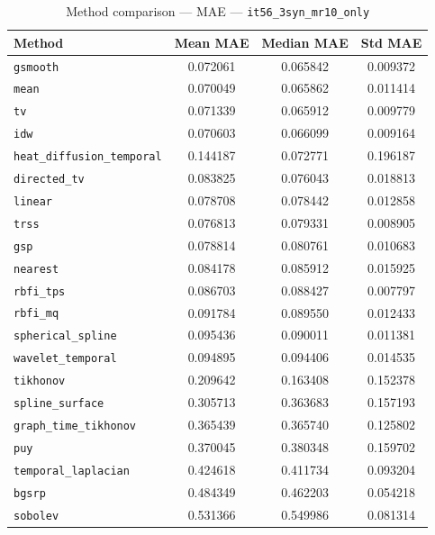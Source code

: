 \begin{table}[ht]
\centering
\caption{Method comparison — MAE — \texttt{it56_3syn_mr10_only}}
\label{tab:mae_it56_3syn_mr10_only}
\begin{tabular}{lccc}
\hline
Method & Mean MAE & Median MAE & Std MAE \\
\hline
\texttt{gsmooth} & 0.072061 & 0.065842 & 0.009372 \\
\texttt{mean} & 0.070049 & 0.065862 & 0.011414 \\
\texttt{tv} & 0.071339 & 0.065912 & 0.009779 \\
\texttt{idw} & 0.070603 & 0.066099 & 0.009164 \\
\texttt{heat_diffusion_temporal} & 0.144187 & 0.072771 & 0.196187 \\
\texttt{directed_tv} & 0.083825 & 0.076043 & 0.018813 \\
\texttt{linear} & 0.078708 & 0.078442 & 0.012858 \\
\texttt{trss} & 0.076813 & 0.079331 & 0.008905 \\
\texttt{gsp} & 0.078814 & 0.080761 & 0.010683 \\
\texttt{nearest} & 0.084178 & 0.085912 & 0.015925 \\
\texttt{rbfi_tps} & 0.086703 & 0.088427 & 0.007797 \\
\texttt{rbfi_mq} & 0.091784 & 0.089550 & 0.012433 \\
\texttt{spherical_spline} & 0.095436 & 0.090011 & 0.011381 \\
\texttt{wavelet_temporal} & 0.094895 & 0.094406 & 0.014535 \\
\texttt{tikhonov} & 0.209642 & 0.163408 & 0.152378 \\
\texttt{spline_surface} & 0.305713 & 0.363683 & 0.157193 \\
\texttt{graph_time_tikhonov} & 0.365439 & 0.365740 & 0.125802 \\
\texttt{puy} & 0.370045 & 0.380348 & 0.159702 \\
\texttt{temporal_laplacian} & 0.424618 & 0.411734 & 0.093204 \\
\texttt{bgsrp} & 0.484349 & 0.462203 & 0.054218 \\
\texttt{sobolev} & 0.531366 & 0.549986 & 0.081314 \\
\hline
\end{tabular}
\end{table}
